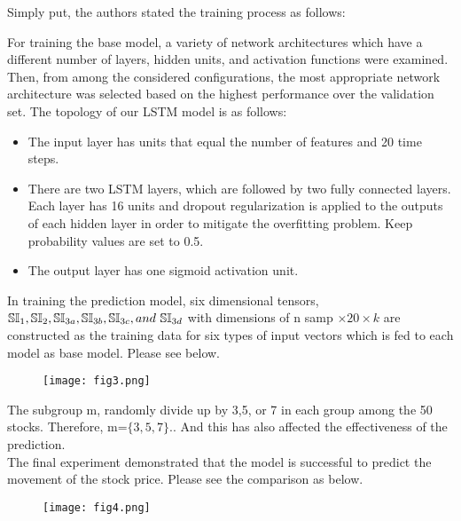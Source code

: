 \documentclass[11pt, oneside]{article}
\begin{document}
\begin{Large}
Simply put, the authors stated the training process as follows:

For training the base model, a variety of network architectures which have a different number of
layers, hidden units, and activation functions were examined. Then, from among the considered
configurations, the most appropriate network architecture was selected based on the highest
performance over the validation set. The topology of our LSTM model is as follows:
\begin{itemize}
\item The input layer has units that equal the number of features and 20 time steps.
\item There are two LSTM layers, which are followed by two fully connected layers. 
Each layer has 16 units and dropout regularization is applied to the outputs of each
hidden layer in order to mitigate the overfitting problem. Keep probability values are set to 0.5.
\item The output layer has one sigmoid activation unit.
\end{itemize}

In training the prediction model, six dimensional tensors, $\mathbb{SI}_1, \mathbb{SI}_2,\\
 \mathbb{SI}_{3a}, \mathbb{SI}_{3b}, \mathbb{SI}_{3c}, and\ \mathbb{SI}_{3d}$
with dimensions of n samp $\times 20 \times k$ are constructed as the training data for six types of input vectors which is fed to each model as base model.  Please see below.

\begin{figure}[h!]
  \texttt{[image: fig3.png]}
\end{figure}
The subgroup m, randomly divide up by 3,5, or 7 in each group among the 50 stocks. Therefore, m=$\{3,5,7\}.$. And this has also affected the effectiveness of the prediction.\\

The final experiment demonstrated that the model is successful to predict the movement of the stock price.  Please see the comparison as below.

\begin{figure}[h!]
  \texttt{[image: fig4.png]}
\end{figure}

\end{Large}
\end{document}
